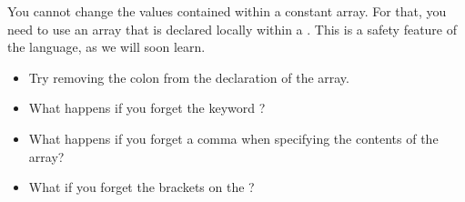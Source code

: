 You cannot change the values contained within a constant array. For that, you need to use an array that is declared locally within a \PROC. This is a safety feature of the language, as we will soon learn.

\makingthingsbreak

\begin{itemize}
	\item Try removing the colon from the declaration of the array.
	\item What happens if you forget the keyword \VAL?
	\item What happens if you forget a comma when specifying the contents of the array?
	\item What if you forget the brackets on the {\code []\INT}?
\end{itemize}

\seealso

\XXX